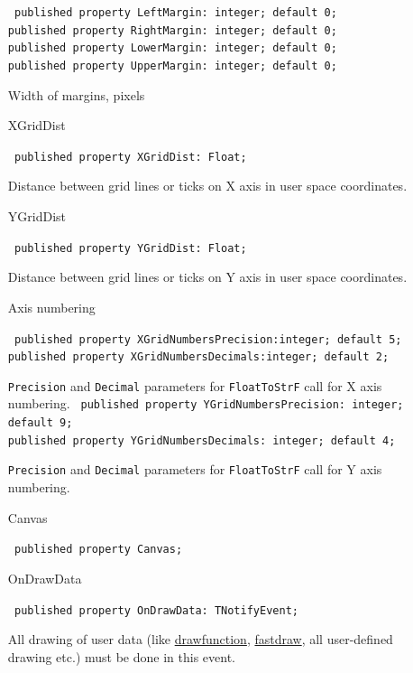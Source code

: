 \documentclass[12pt,a4paper,oneside]{report}
\newcommand{\inlineitem}[1]{{\addfontfeatures{FakeBold} #1}}
\newcommand{\code}[1]{\texttt{#1}}
\begin{document}
\begin{itemize}
\begin{flushleft}
\code{
published property LeftMargin: integer; default 0;\\
published property RightMargin: integer; default 0;\\
published property LowerMargin: integer; default 0;\\
published property UpperMargin: integer; default 0;}
\end{flushleft}
\par Width of margins, pixels
\label{lmcoordsys.TCoordSys-XGridDist}
\item[\inlineitem{XGridDist}\hfill]
\begin{flushleft}
\code{
published property XGridDist: Float;}
\end{flushleft}
Distance between grid lines or ticks on X axis in user space coordinates. \label{lmcoordsys.TCoordSys-YGridDist}
\item[\inlineitem{YGridDist}\hfill]
\begin{flushleft}
\code{
published property YGridDist: Float;}
\end{flushleft}
Distance between grid lines or ticks on Y axis in user space coordinates. 

\label{lmcoordsys.TCoordSys-XGridNumbersPrecision}
\item [\inlineitem{Axis numbering}]
\begin{flushleft}
\code{
published property XGridNumbersPrecision:integer; default 5;\\
published property XGridNumbersDecimals:integer; default 2;}
\end{flushleft}
\par\code{Precision} and \code{Decimal} parameters for \code{FloatToStrF} call for X axis numbering. \label{lmcoordsys.TCoordSys-XGridNumbersDecimals}
\label{lmcoordsys.TCoordSys-YGridNumbersPrecision}
\code{
published property YGridNumbersPrecision: integer; default 9;\\
published property YGridNumbersDecimals: integer; default 4;}
\par \code{Precision} and \code{Decimal} parameters for \code{FloatToStrF} call for Y axis  numbering. \label{lmcoordsys.TCoordSys-YGridNumbersDecimals}
\label{lmcoordsys.TCoordSys-Canvas}
\item[\inlineitem{Canvas}\hfill]
\begin{flushleft}
\code{
published property Canvas;}
\end{flushleft}
\label{lmcoordsys.TCoordSys-OnDrawData}
\item[\inlineitem{OnDrawData}\hfill]
\begin{flushleft}
\code{
published property OnDrawData: TNotifyEvent;}
\end{flushleft}
All drawing of user data (like \hyperref[lmcoordsys.TCoordSys-DrawFunc]{drawfunction}, \hyperref[lmcoordsys.TCoordSys-FastDraw]{fastdraw}, all user-defined drawing etc.) must be done in this event.\end{itemize}
\end{document}
